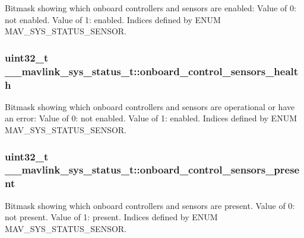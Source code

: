 Bitmask showing which onboard controllers and sensors are enabled\+: Value of 0\+: not enabled. Value of 1\+: enabled. Indices defined by E\+N\+U\+M M\+A\+V\+\_\+\+S\+Y\+S\+\_\+\+S\+T\+A\+T\+U\+S\+\_\+\+S\+E\+N\+S\+O\+R. 

\hypertarget{struct____mavlink__sys__status__t_a8527d9f9e9517ee5a9dc7aba0235ace9}{
\subsubsection[{onboard\+\_\+control\+\_\+sensors\+\_\+health}]{\setlength{\rightskip}{0pt plus 5cm}uint32\+\_\+t \+\_\+\+\_\+mavlink\+\_\+sys\+\_\+status\+\_\+t\+::onboard\+\_\+control\+\_\+sensors\+\_\+health}}\label{struct____mavlink__sys__status__t_a8527d9f9e9517ee5a9dc7aba0235ace9}


Bitmask showing which onboard controllers and sensors are operational or have an error\+: Value of 0\+: not enabled. Value of 1\+: enabled. Indices defined by E\+N\+U\+M M\+A\+V\+\_\+\+S\+Y\+S\+\_\+\+S\+T\+A\+T\+U\+S\+\_\+\+S\+E\+N\+S\+O\+R. 

\hypertarget{struct____mavlink__sys__status__t_a9c506f0a78266af5a1230eb1a0ca78b9}{
\subsubsection[{onboard\+\_\+control\+\_\+sensors\+\_\+present}]{\setlength{\rightskip}{0pt plus 5cm}uint32\+\_\+t \+\_\+\+\_\+mavlink\+\_\+sys\+\_\+status\+\_\+t\+::onboard\+\_\+control\+\_\+sensors\+\_\+present}}\label{struct____mavlink__sys__status__t_a9c506f0a78266af5a1230eb1a0ca78b9}


Bitmask showing which onboard controllers and sensors are present. Value of 0\+: not present. Value of 1\+: present. Indices defined by E\+N\+U\+M M\+A\+V\+\_\+\+S\+Y\+S\+\_\+\+S\+T\+A\+T\+U\+S\+\_\+\+S\+E\+N\+S\+O\+R. 

